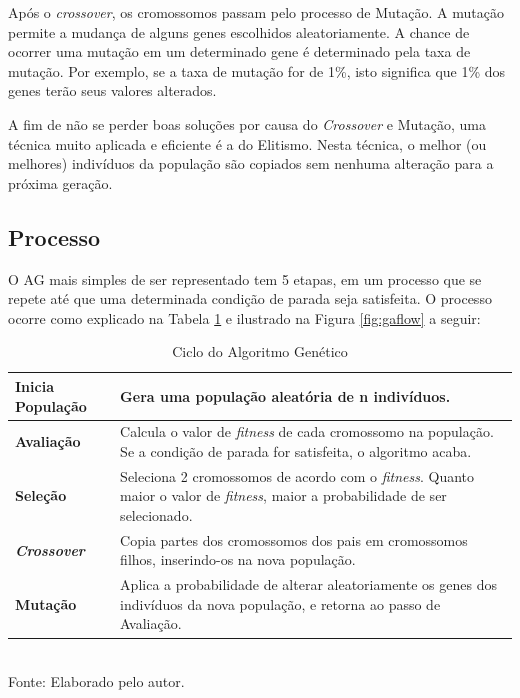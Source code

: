 \documentclass[
	12pt,					%
	openright,				%
	oneside,				%
	a4paper,				%
	bibjustif,				%
	chapter=TITLE,			%
	english,				%
	brazil,					%
	]{abntex2}
\newcommand{\source}[1]{\small Fonte: {#1}}
\begin{document}
	Após o \textit{crossover},
	os cromossomos passam pelo processo de Mutação.
	A mutação permite a mudança de alguns genes escolhidos aleatoriamente.
	A chance de ocorrer uma mutação em um determinado gene é determinado pela taxa de mutação.
	Por exemplo, se a taxa de mutação for de 1\%,
	isto significa que 1\% dos genes terão seus valores alterados.
	
	A fim de não se perder boas soluções por causa do \textit{Crossover} e Mutação,
	uma técnica muito aplicada e eficiente é a do Elitismo.
	Nesta técnica, o melhor (ou melhores) indivíduos da população são copiados sem nenhuma alteração para a próxima geração.
	
	\FloatBarrier
	\subsection{Processo} \label{ssec:processo}
	O AG mais simples de ser representado tem 5 etapas,
	em um processo que se repete até que uma determinada condição de parada seja satisfeita.
	O processo ocorre como explicado na Tabela \ref{tab:agCycle} e ilustrado na Figura \ref{fig:gaflow} a seguir:
	
	\begin{table}[h]
		\caption{Ciclo do Algoritmo Genético}
		\centering
		\small
		\renewcommand{\arraystretch}{1.2} %
		\begin{tabular}{>{\centering\arraybackslash}m{3.5cm} m{11.5cm}}
			\hline 
			\textbf{Inicia População} & Gera uma população aleatória de n indivíduos. \\ 
			\hline 
			\textbf{Avaliação} & Calcula o valor de \textit{fitness} de cada cromossomo na população. Se a condição de parada for satisfeita, o algoritmo acaba. \\ 
			\hline 
			\textbf{Seleção} & Seleciona 2 cromossomos de acordo com o \textit{fitness}. Quanto maior o valor de \textit{fitness}, maior a probabilidade de ser selecionado. \\ 
			\hline 
			\textbf{\textit{Crossover}} & Copia partes dos cromossomos dos pais em cromossomos filhos, inserindo-os na nova população. \\ 
			\hline 
			\textbf{Mutação} & Aplica a probabilidade de alterar aleatoriamente os genes dos indivíduos da nova população, e retorna ao passo de Avaliação. \\ 
			\hline 
		\end{tabular}\\
		\vspace{3mm}
		\source{Elaborado pelo autor.}
		\label{tab:agCycle}
	\end{table}
	
\end{document}
